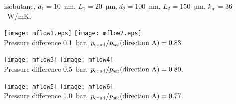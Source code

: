 \documentclass{minimal}
\begin{document}
\centerline{\fontsize{12}{10}\selectfont Isobutane, $d_1=10$~nm, $L_1 = 20$~µm,
$d_2=100$~nm, $L_2=150$~µm. $k_\mathrm m=36$~W/mK.}\bigskip\bigskip

\raggedright\noindent
\texttt{[image: mflow1.eps]}
\texttt{[image: mflow2.eps]}\\
Pressure difference 0.1~bar.
$p_\mathrm{cond}/p_\mathrm{sat}(\hbox{direction A}) = 0.83$.
\bigskip\bigskip

\texttt{[image: mflow3]}
\texttt{[image: mflow4]}\\
Pressure difference 0.5~bar.
$p_\mathrm{cond}/p_\mathrm{sat}(\hbox{direction A}) = 0.80$.
\bigskip\bigskip

\texttt{[image: mflow5]}
\texttt{[image: mflow6]}\\
Pressure difference 1.0~bar.
$p_\mathrm{cond}/p_\mathrm{sat}(\hbox{direction A}) = 0.77$.
\end{document}
